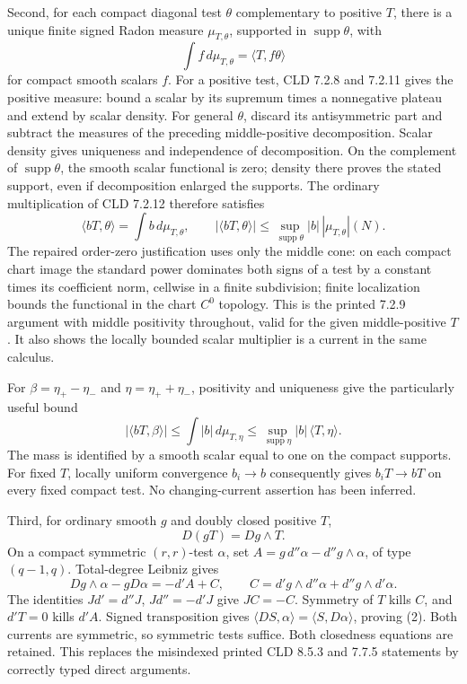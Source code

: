 \documentclass[11pt]{article}
\begin{document}
Second, for each compact diagonal test \(\theta\) complementary to positive \(T\), there is a unique finite signed Radon measure \(\mu_{T,\theta}\), supported in \(\operatorname{supp}\theta\), with
\[
 \int f\,d\mu_{T,\theta}=\langle T,f\theta\rangle
\]
for compact smooth scalars \(f\). For a positive test, CLD 7.2.8 and 7.2.11 gives the positive measure: bound a scalar by its supremum times a nonnegative plateau and extend by scalar density. For general \(\theta\), discard its antisymmetric part and subtract the measures of the preceding middle-positive decomposition. Scalar density gives uniqueness and independence of decomposition. On the complement of \(\operatorname{supp}\theta\), the smooth scalar functional is zero; density there proves the stated support, even if decomposition enlarged the supports. The ordinary multiplication of CLD 7.2.12 therefore satisfies
\[
 \langle bT,\theta\rangle=\int b\,d\mu_{T,\theta},\qquad
 |\langle bT,\theta\rangle|\leq\sup_{\operatorname{supp}\theta}|b|\,|\mu_{T,\theta}|(N).
\]
The repaired order-zero justification uses only the middle cone: on each compact chart image the standard power dominates both signs of a test by a constant times its coefficient norm, cellwise in a finite subdivision; finite localization bounds the functional in the chart \(C^0\) topology. This is the printed 7.2.9 argument with middle positivity throughout, valid for the given middle-positive \(T\). It also shows the locally bounded scalar multiplier is a current in the same calculus.

For \(\beta=\eta_+-\eta_-\) and \(\eta=\eta_++\eta_-\), positivity and uniqueness give the particularly useful bound
\[
 |\langle bT,\beta\rangle|
 \leq\int |b|\,d\mu_{T,\eta}
 \leq\sup_{\operatorname{supp}\eta}|b|\,\langle T,\eta\rangle.                 \tag{1}
\]
The mass is identified by a smooth scalar equal to one on the compact supports. For fixed \(T\), locally uniform convergence \(b_i\to b\) consequently gives \(b_iT\to bT\) on every fixed compact test. No changing-current assertion has been inferred.

Third, for ordinary smooth \(g\) and doubly closed positive \(T\),
\[
 D(gT)=Dg\wedge T.                                                        \tag{2}
\]
On a compact symmetric \((r,r)\)-test \(\alpha\), set \(A=g\,d''\alpha-d''g\wedge\alpha\), of type \((q-1,q)\). Total-degree Leibniz gives
\[
 Dg\wedge\alpha-gD\alpha=-d'A+C,\qquad
 C=d'g\wedge d''\alpha+d''g\wedge d'\alpha.
\]
The identities \(Jd'=d''J\), \(Jd''=-d'J\) give \(JC=-C\). Symmetry of \(T\) kills \(C\), and \(d'T=0\) kills \(d'A\). Signed transposition gives \(\langle DS,\alpha\rangle=\langle S,D\alpha\rangle\), proving (2). Both currents are symmetric, so symmetric tests suffice. Both closedness equations are retained. This replaces the misindexed printed CLD 8.5.3 and 7.7.5 statements by correctly typed direct arguments.
\end{document}
